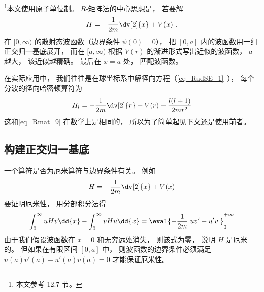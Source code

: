

\footnote{本文参考 \cite{Bransden} 12.7 节。}本文使用原子单位制。 $R$-矩阵法的中心思想是， 若要解
\begin{equation}\label{eq_Rmat_9}
H = -\frac{1}{2m}\dv[2]{x} + V(x)~.
\end{equation}
在 $[0, \infty)$ 的散射态波函数（边界条件 $\psi(0) = 0$）， 把 $[0,a]$ 内的波函数用一组正交归一基底展开， 而在 $[a,\infty)$ 根据 $V(r)$ 的渐进形式写出近似的波函数， $a$ 越大， 该近似越精确。 最后在 $x=a$ 处， 匹配波函数。

在实际应用中， 我们往往是在球坐标系中解径向方程（\autoref{eq_RadSE_1}~）， 每个分波的径向哈密顿算符为
\begin{equation}
H_l = -\frac{1}{2m} \dv[2]{r} + V(r) + \frac{l(l + 1)}{2mr^2}
\end{equation}
这和\autoref{eq_Rmat_9} 在数学上是相同的， 所以为了简单起见下文还是使用前者。

\subsection{构建正交归一基底}
一个算符是否为厄米算符与边界条件有关。 例如
\begin{equation}
H = -\frac{1}{2m}\dv[2]{x} + V(x)
\end{equation}
要证明厄米性， 用分部积分法得
\begin{equation}\label{eq_Rmat_1}
\int_{0}^{\infty} uHv\dd{x} - \int_{0}^{\infty} vHu\dd{x}
= \eval{-\frac{1}{2m}[uv' - u'v]}_{0}^{+\infty}
\end{equation}
由于我们假设波函数在 $x=0$ 和无穷远处消失， 则该式为零， 说明 $H$ 是厄米的。 但如果在有限区间 $[0, a]$ 中， 则波函数的边界条件必须满足 $u(a)v'(a) - u'(a)v(a) = 0$ 才能保证厄米性。

